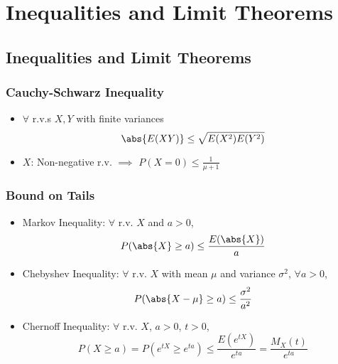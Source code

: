 \section{Inequalities and Limit Theorems}

\subsection{Inequalities and Limit Theorems}

\subsubsection*{Cauchy-Schwarz Inequality}
\begin{itemize}
    \item $\forall$ r.v.s $X,Y$ with finite variances
    \begin{equation}
        \abs{E(XY)}\leq\sqrt{E(X^2)E(Y^2)}
    \end{equation}
    \item $X$: Non-negative r.v. $\implies$ $P(X=0)\leq\frac{1}{\mu+1}$
\end{itemize}

\subsubsection*{Bound on Tails}
\begin{itemize}
    \item Markov Inequality: $\forall$ r.v. $X$ and $a>0$,
    \begin{equation}
        P(\abs{X}\geq a)\leq\frac{E(\abs{X})}{a}
    \end{equation}
    \item Chebyshev Inequality: $\forall$ r.v. $X$ with mean $\mu$ and variance $\sigma^2$, $\forall a>0$,
    \begin{equation}
        P(\abs{X-\mu}\geq a)\leq\frac{\sigma^2}{a^2}
    \end{equation}
    \item Chernoff Inequality: $\forall$ r.v. $X$, $a>0$, $t>0$,
    \begin{equation}
        P(X\geq a)=P\left(e^{tX}\geq e^{ta}\right)\leq\frac{E\left(e^{tX}\right)}{e^{ta}}=\frac{M_X(t)}{e^{ta}}
    \end{equation}
\end{itemize}

